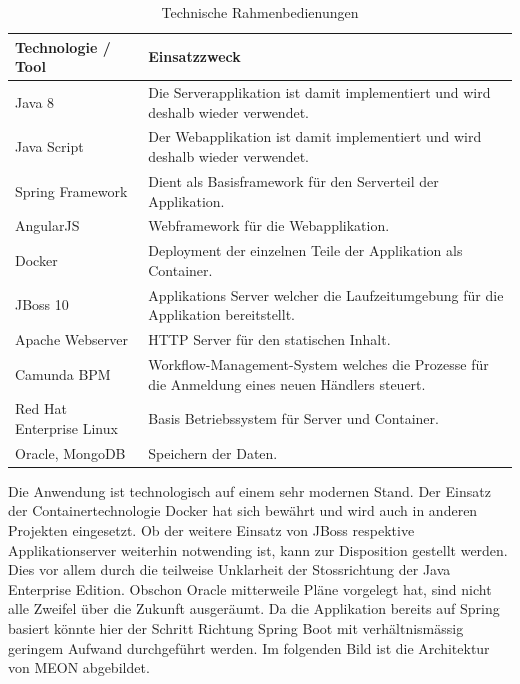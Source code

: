 \begin{table}[H]
	\centering
	\caption{Technische Rahmenbedienungen}
	\begin{tabular}{ | p{4cm} | p{12cm} | }
		\toprule
		{\textbf{Technologie / Tool}} & {\textbf{Einsatzzweck}} \\
		\midrule
		Java 8 & Die Serverapplikation ist damit implementiert und wird deshalb wieder verwendet. \\ \hline
		Java Script & Der Webapplikation ist damit implementiert und wird deshalb wieder verwendet. \\ \hline
		Spring Framework & Dient als Basisframework für den Serverteil der Applikation.  \\ \hline
		AngularJS & Webframework für die Webapplikation. \\ \hline
		Docker & Deployment der einzelnen Teile der Applikation als Container. \\ \hline
		JBoss 10 & Applikations Server welcher die Laufzeitumgebung für die Applikation bereitstellt. \\ \hline
		Apache Webserver & HTTP Server für den statischen Inhalt. \\ \hline
		Camunda BPM & Workflow-Management-System welches die Prozesse für die Anmeldung eines neuen Händlers steuert. \\ \hline
		Red Hat Enterprise Linux & Basis Betriebssystem für Server und Container.\\ \hline
		Oracle, MongoDB & Speichern der Daten. \\
		\bottomrule
	\end{tabular}
\end{table}

Die Anwendung ist technologisch auf einem sehr modernen Stand. Der Einsatz der Containertechnologie Docker hat sich bewährt und wird auch in anderen Projekten eingesetzt. Ob der weitere Einsatz von JBoss respektive Applikationserver weiterhin notwending ist, kann zur Disposition gestellt werden. Dies vor allem durch die teilweise Unklarheit der Stossrichtung der Java Enterprise Edition. Obschon Oracle mitterweile Pläne vorgelegt hat, sind nicht alle Zweifel über die Zukunft ausgeräumt. Da die Applikation bereits auf Spring basiert könnte hier der Schritt Richtung Spring Boot mit verhältnismässig geringem Aufwand durchgeführt werden.
Im folgenden Bild ist die Architektur von MEON abgebildet.

